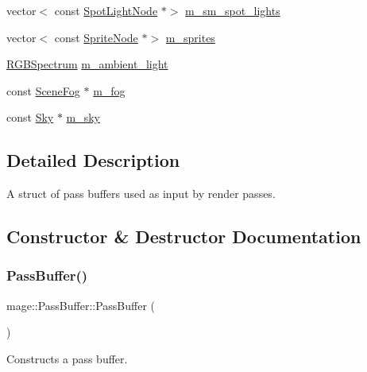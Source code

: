 \begin{DoxyCompactItemize}
\item 
vector$<$ const \hyperlink{namespacemage_aeed5dee4ff6c591eabb0e9114256df4a}{Spot\+Light\+Node} $\ast$$>$ \hyperlink{structmage_1_1_pass_buffer_aa28fb6d14ea463f82f35117e8dfa23fc}{m\+\_\+sm\+\_\+spot\+\_\+lights}
\item 
vector$<$ const \hyperlink{classmage_1_1_sprite_node}{Sprite\+Node} $\ast$$>$ \hyperlink{structmage_1_1_pass_buffer_ad742ad6712a63e9d58621da83a7fb900}{m\+\_\+sprites}
\item 
\hyperlink{structmage_1_1_r_g_b_spectrum}{R\+G\+B\+Spectrum} \hyperlink{structmage_1_1_pass_buffer_a311ad723470aff0ad80c325d9ead07b9}{m\+\_\+ambient\+\_\+light}
\item 
const \hyperlink{structmage_1_1_scene_fog}{Scene\+Fog} $\ast$ \hyperlink{structmage_1_1_pass_buffer_a3691cc52fe3bc5f1c86bf0dad36061d8}{m\+\_\+fog}
\item 
const \hyperlink{structmage_1_1_sky}{Sky} $\ast$ \hyperlink{structmage_1_1_pass_buffer_a19d0163dbfe7e60c664fdf433d47146b}{m\+\_\+sky}
\end{DoxyCompactItemize}


\subsection{Detailed Description}
A struct of pass buffers used as input by render passes. 

\subsection{Constructor \& Destructor Documentation}
\hypertarget{structmage_1_1_pass_buffer_a02e07a26327f6e57b193521636bb8e10}{}\label{structmage_1_1_pass_buffer_a02e07a26327f6e57b193521636bb8e10} 
\subsubsection{\texorpdfstring{Pass\+Buffer()}{PassBuffer()}\hspace{0.1cm}{\footnotesize\ttfamily [1/3]}}
{\footnotesize\ttfamily mage\+::\+Pass\+Buffer\+::\+Pass\+Buffer (\begin{DoxyParamCaption}{ }\end{DoxyParamCaption})}

Constructs a pass buffer. \hypertarget{structmage_1_1_pass_buffer_a1c6e779725227ebbb8e3d15a4515edbc}{}\label{structmage_1_1_pass_buffer_a1c6e779725227ebbb8e3d15a4515edbc} 
